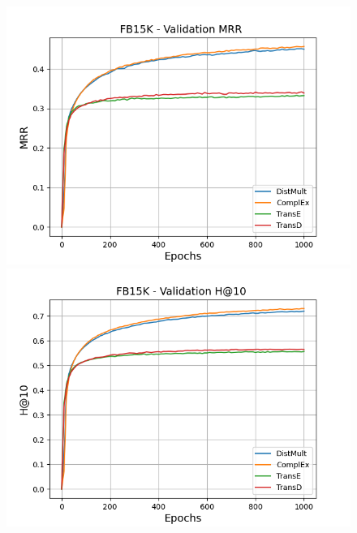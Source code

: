 \begin{figure}[H]
    \centering
    \begin{minipage}{.3\textwidth}
      \centering
      \includegraphics[width=\linewidth]{figures/results/pretrain/fb15k/pretrain_fb15k_mrrs.png}
    \end{minipage}%
    \begin{minipage}{.3\textwidth}
      \centering
      \includegraphics[width=\linewidth]{figures/results/pretrain/fb15k/pretrain_fb15k_hit10.png}
    \end{minipage}
    \begin{minipage}{.3\textwidth}
      \centering

\end{minipage}
\end{figure}

